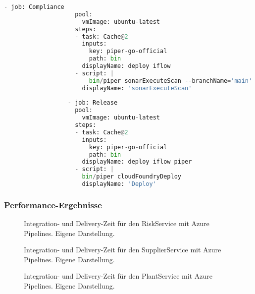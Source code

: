 \begin{lstlisting}[language=Python, breaklines=true, basicstyle=\small\ttfamily, frame=single]
                  - job: Compliance
                    pool:
                      vmImage: ubuntu-latest
                    steps:
                    - task: Cache@2
                      inputs:
                        key: piper-go-official
                        path: bin 
                      displayName: deploy iflow
                    - script: |
                        bin/piper sonarExecuteScan --branchName='main' --githubToken=$(Github_Token) --token=$(Token) --serverUrl=$(serverUrl)
                      displayName: 'sonarExecuteScan'
                            
                  - job: Release
                    pool:
                      vmImage: ubuntu-latest
                    steps:
                    - task: Cache@2
                      inputs:
                        key: piper-go-official
                        path: bin 
                      displayName: deploy iflow piper
                    - script: |
                      bin/piper cloudFoundryDeploy 
                      displayName: 'Deploy' 
                \end{lstlisting}
\subsubsection{Performance-Ergebnisse}                
\begin{center}
	\begin{figure}[H]
		\centering
		\caption[]{Integration- und Delivery-Zeit für den RiskService mit Azure Pipelines. Eigene Darstellung.}
		\label{fig:AP_Risk}
	\end{figure}
\end{center}

\begin{center}
	\begin{figure}[H]
		\centering
		\caption[]{Integration- und Delivery-Zeit für den SupplierService mit Azure Pipelines. Eigene Darstellung.}
		\label{fig:AP_Supplier}
	\end{figure}
\end{center}
\begin{center}
	\begin{figure}[H]
		\centering
		\caption[]{Integration- und Delivery-Zeit für den PlantService mit Azure Pipelines. Eigene Darstellung.}
		\label{fig:AP_Plant}
	\end{figure}
\end{center}
                 
